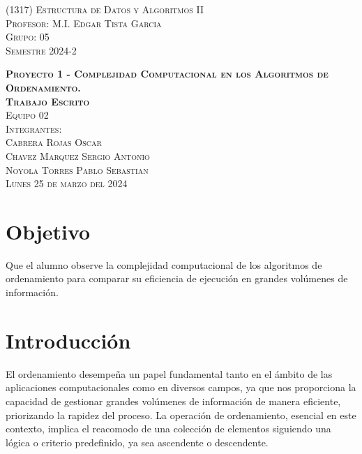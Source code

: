\documentclass[a4paper,12pt]{article}
\begin{document}
\begin{titlepage}
\begin{minipage}[c][0.81\textheight][t]{0.75\textwidth}
\begin{center}
                {\large\scshape (1317) Estructura de Datos y Algoritmos II }\\[.2in]
                
                \textsc{\large Profesor: M.I. Edgar Tista Garcia}\\[.25cm]
                \textsc{\large Grupo: 05}\\ [.25cm]
                \textsc{\large Semestre 2024-2}\\

                \vspace{1cm}            
 
                \textsc{\large \textbf{Proyecto 1 - Complejidad Computacional en los Algoritmos de Ordenamiento.}}\\[.5cm]
                \textsc{\large \textbf{Trabajo Escrito}}\\[1cm]
                \textsc{\large Equipo 02}\\ [1cm]
                \textsc{\large Integrantes:}\\[0.25cm]
                \textsc{\large Cabrera Rojas Oscar}\\[0.25cm]
                \textsc{\large Chavez Marquez Sergio Antonio}\\[0.25cm]
                \textsc{\large {Noyola Torres Pablo Sebastian}}\\[2cm]          


                \vspace{0.5cm}
                \textsc{\large Lunes 25 de marzo del 2024}\\[0.25cm]
            \end{center}
        \end{minipage}
    \end{titlepage}

\section{Objetivo}

Que el alumno observe la complejidad computacional de los algoritmos de ordenamiento para comparar su eficiencia de ejecución en grandes volúmenes de información.

\section{Introducción}

El ordenamiento desempeña un papel fundamental tanto en el ámbito de las aplicaciones computacionales como en diversos campos, ya que nos proporciona la capacidad de gestionar grandes volúmenes de información de manera eficiente, priorizando la rapidez del proceso. La operación de ordenamiento, esencial en este contexto, implica el reacomodo de una colección de elementos siguiendo una lógica o criterio predefinido, ya sea ascendente o descendente.
\end{document}

